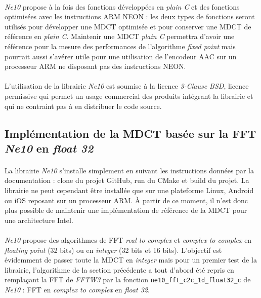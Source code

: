 \documentclass{article}
\begin{document}
    \paragraph{}
    \emph{Ne10} propose à la fois des fonctions développées en \emph{plain C} et des fonctions optimisées avec les instructions ARM NEON : les deux types de fonctions seront utilisés pour développer une MDCT optimisée et pour conserver une MDCT de référence en \emph{plain C}. Maintenir une MDCT \emph{plain C} permettra d'avoir une référence pour la mesure des performances de l'algorithme \emph{fixed point} mais pourrait aussi s'avérer utile pour une utilisation de l'encodeur AAC sur un processeur ARM ne disposant pas des instructions NEON.

    \paragraph{}
    L'utilisation de la librairie \emph{Ne10} est soumise à la licence \emph{3-Clause BSD}, licence permissive qui permet un usage commercial des produits intégrant la librairie et qui ne contraint pas à en distribuer le code source\cite{BSD}.

    \subsection{Implémentation de la MDCT basée sur la FFT \emph{Ne10} en \emph{float 32}}
    \paragraph{}
    La librairie \emph{Ne10} s'installe simplement en suivant les instructions données par la documentation : clone du projet GitHub, run du CMake et build du projet\cite{Ne10}. La librairie ne peut cependant être installée que sur une plateforme Linux, Android ou iOS reposant sur un processeur ARM. À partir de ce moment, il n'est donc plus possible de maintenir une implémentation de référence de la MDCT pour une architecture Intel.

    \paragraph{}
    \emph{Ne10} propose des algorithmes de FFT \emph{real to complex} et \emph{complex to complex} en \emph{floating point} (32 bits) ou en \emph{integer} (32 bits et 16 bits). L'objectif est évidemment de passer toute la MDCT en \emph{integer} mais pour un premier test de la librairie, l'algorithme de la section précédente a tout d'abord été repris en remplaçant la FFT de \emph{FFTW3} par la fonction \texttt{ne10\_fft\_c2c\_1d\_float32\_c} de \emph{Ne10} : FFT en \emph{complex to complex} en \emph{float 32}.
\end{document}
